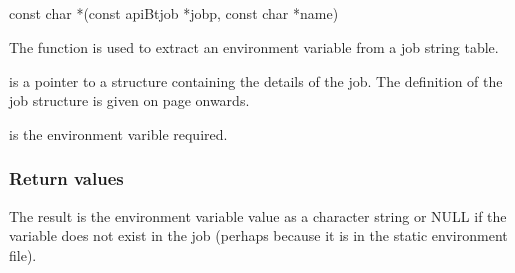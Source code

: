 \subsection{\funcnameXBgetenv{}}

\begin{expara}

const char *\funcnameXBgetenv{}(const apiBtjob *jobp, const char *name)

\end{expara}

The function \funcXBgetenv{} is used to extract an
environment variable from a job string table.

 is a pointer to a structure containing the
details of the job. The definition of the job structure is given on
page \pageref{bkm:Jobstructure} onwards.

 is the environment varible required.

\subsubsection{Return values}
The result is the environment variable value as a
 character string or NULL if the variable does
not exist in the job (perhaps because it is in the static environment
file).


